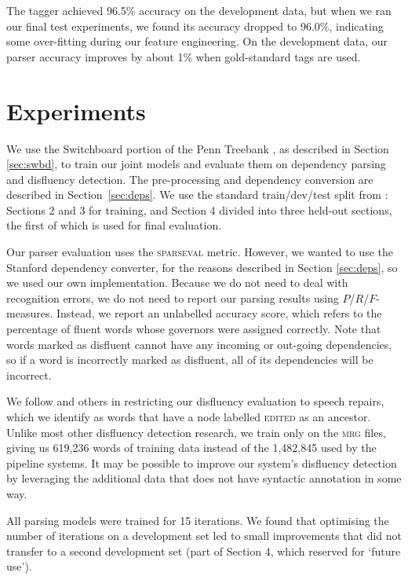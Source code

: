 \documentclass[11pt,letterpaper]{article}
\newcommand{\sparseval}{\textsc{sparseval}\xspace}
\begin{document}
The tagger achieved 96.5\% accuracy on the development data, but when we ran our
final test experiments, we found its accuracy dropped to 96.0\%, indicating
some over-fitting during our feature engineering.  On the development data,
our parser accuracy improves by about 1\% when gold-standard tags are used.

\section{Experiments}

We use the Switchboard portion of the Penn Treebank \citep{marcus:93}, as
described in Section \ref{sec:swbd}, to train our joint
models and evaluate them on dependency parsing and disfluency detection. The
pre-processing and dependency conversion are described in Section~\ref{sec:deps}.
We use the standard train/dev/test split from \citet{Charniak01a}: Sections 2
and 3 for training, and Section 4 divided into three held-out sections, the first
of which is used for final evaluation.

Our parser evaluation uses the \sparseval \citep{sparseval} metric.
However, we wanted to use the Stanford dependency converter, for the 
reasons described in Section \ref{sec:deps}, so we
used our own implementation.
Because we do not need to deal with recognition
errors, we do not need to report our parsing results using $P$/$R$/$F$-measures.
Instead, we report an unlabelled accuracy score, which refers to the percentage
of fluent words whose governors were assigned correctly.  Note that words marked
as disfluent cannot have any incoming or out-going dependencies, so if a word is
incorrectly marked as disfluent, all of its dependencies will be incorrect.

We follow \citet{Johnson04a} and others in restricting our disfluency evaluation
to speech repairs, which we identify as words that have a node labelled \textsc{edited}
as an ancestor.  Unlike most other disfluency detection research, we train only
on the \textsc{mrg} files, giving us 619,236 words of training data instead of
the 1,482,845 used by the pipeline systems.  It may be possible to improve our
system's disfluency detection by leveraging the additional data that does not
have syntactic annotation in some way.

All parsing models were trained for 15 iterations.
We found that optimising the number of iterations on a development set led to
small improvements that did not transfer to a second development set (part of
Section 4, which \citet{Charniak01a} reserved for `future use').
\end{document}

